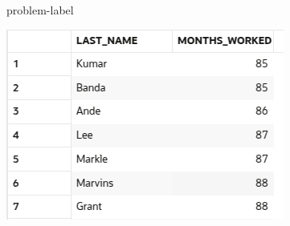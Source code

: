 \begin{problem}{}{problem-label}
\vspace{1em}

\begin{center}
  \includegraphics[scale=0.8]{images/c3a6.png}
\end{center}

\end{problem}


